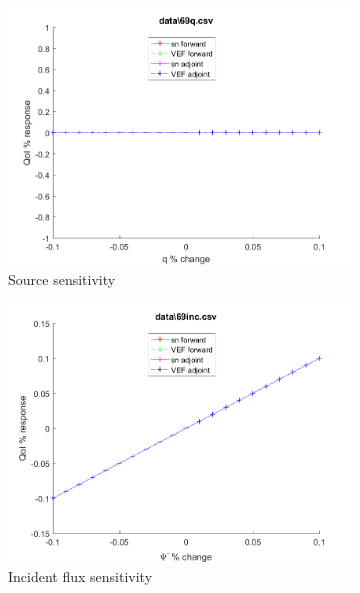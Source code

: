 \documentclass{article}
\begin{document}
\begin{figure}[H]
\label{Case69Sens}
\centering
\begin{subfigure}{.5\textwidth}
  \centering
  \includegraphics[width=.98\linewidth]{IanProposal/figures2/69qSens.png}
  \caption{Source sensitivity}
  \label{fig:sfig1}
\end{subfigure}%
\begin{subfigure}{.5\textwidth}
  \centering
  \includegraphics[width=.98\linewidth]{IanProposal/figures2/69incSens.png}
  \caption{Incident flux sensitivity}
  \label{fig:sfig4}
\end{subfigure}%
\\
\begin{subfigure}{.5\textwidth}
  \centering

\end{subfigure}
\end{figure}
\end{document}
